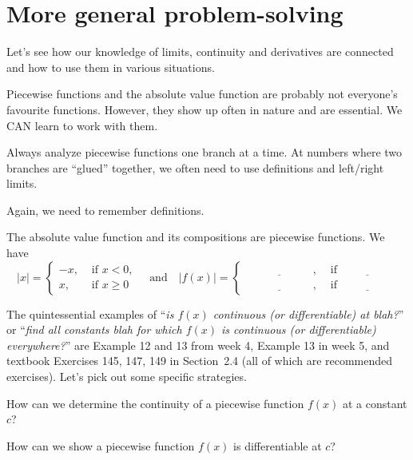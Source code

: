 \documentclass[../main.tex]{subfiles}
\begin{document}
 \section{More general problem-solving}
  Let's see how our knowledge of limits, continuity and derivatives are connected and how to use them in various situations.

  \clearpage

  Piecewise functions and the absolute value function are probably not everyone's favourite functions. However, they show up often in nature and are essential. We CAN learn to work with them.

  \begin{mdframed}[style=simple-compact]
    Always analyze piecewise functions one branch at a time. At numbers where two branches are ``glued'' together, we often need to use definitions and left/right limits.

    Again, we need to remember definitions.
  \end{mdframed}

  The absolute value function and its compositions are piecewise functions. We have
  \[
    |x| = 
    \begin{cases}
      -x, &\text{ if } x < 0, \\
      x, &\text{ if } x \ge 0
    \end{cases}
    \quad \text{and} \quad 
    |f(x)| = 
    \begin{cases}
      \underline{\hspace{1in}}, &\text{ if } \underline{\hspace{2cm}} \\
      \underline{\hspace{1in}}, &\text{ if } \underline{\hspace{2cm}}
    \end{cases}
  \]

  The quintessential examples of ``\emph{is \(f(x)\) continuous (or differentiable) at blah?}'' or ``\emph{find all constants blah for which \(f(x)\) is continuous (or differentiable) everywhere?}'' are Example 12 and 13 from week 4, Example 13 in week 5, and textbook Exercises 145, 147, 149 in Section~2.4 (all of which are recommended exercises). Let's pick out some specific strategies.

  \faComment{} How can we determine the continuity of a piecewise function \(f(x)\) at a constant \(c\)?

  \faComment{} How can we show a piecewise function \(f(x)\) is differentiable at \(c\)?
\end{document}
